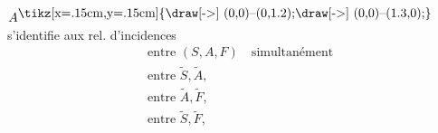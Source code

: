 
$A^{\vcenter{\hbox{\tikz[x=.15cm,y=.15cm]{\draw[->] (0,0)--(0,1.2);\draw[->] (0,0)--(1.3,0);}}}}$ s'identifie aux rel. d'incidences
\[
\begin{aligned}
&\text{entre }(S,A,F)\quad\text{simultanément}\\
&\text{entre }\widetilde S,\widetilde A,\\
&\text{entre }\widetilde A,\widetilde F,\\
&\text{entre }\widetilde S,\widetilde F,
\end{aligned}
\]
